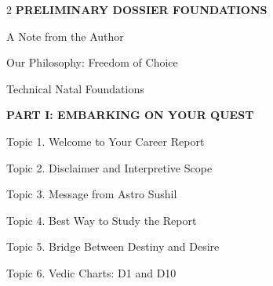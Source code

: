 \documentclass[10pt,oneside]{article}
\renewcommand{\textls}[2][60]{#2}
\begin{document}
\begin{multicols}{2}
  {\sffamily\fontsize{8.5}{11}\selectfont\bfseries\color{ExecutiveNavy}\textls[60]{PRELIMINARY DOSSIER FOUNDATIONS}}\par
  \vspace{1mm}
  {\fontsize{8}{11.5}\selectfont
  A Note from the Author \dotfill \pageref*{authornote}\par
  Our Philosophy: Freedom of Choice \dotfill \pageref*{disclaimersec}\par
  Technical Natal Foundations \dotfill \pageref*{techfoundations}\par}
  \vspace{2.5mm}

  {\sffamily\fontsize{8.5}{11}\selectfont\bfseries\color{ExecutiveNavy}\textls[60]{PART I: EMBARKING ON YOUR QUEST}}\par
  \vspace{1mm}
  {\fontsize{8}{11.5}\selectfont
  Topic 1. Welcome to Your Career Report \dotfill \pageref*{topic1}\par
  Topic 2. Disclaimer and Interpretive Scope \dotfill \pageref*{topic2}\par
  Topic 3. Message from Astro Sushil \dotfill \pageref*{topic3}\par
  Topic 4. Best Way to Study the Report \dotfill \pageref*{topic4}\par
  Topic 5. Bridge Between Destiny and Desire \dotfill \pageref*{topic5}\par
  Topic 6. Vedic Charts: D1 and D10 \dotfill \pageref*{topic6}\par}
  \vspace{2.5mm}


\end{multicols}
\end{document}
